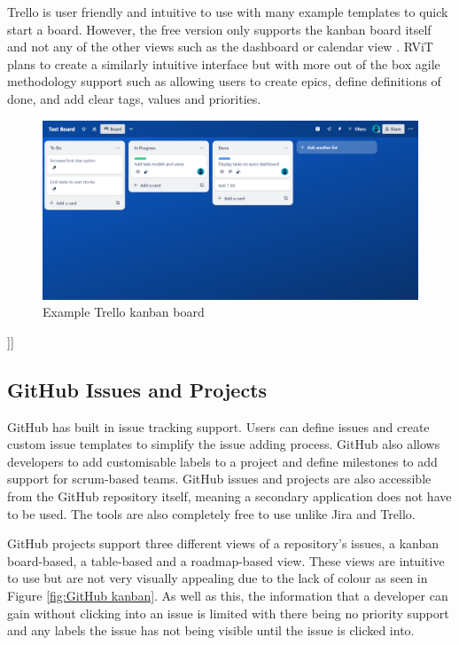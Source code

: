 \documentclass[l4proj.tex]{subfiles}
\begin{document}
Trello is user friendly and intuitive to use with many example templates to quick start a board. However, the free version only supports the kanban board itself and not any of the other views such as the dashboard or calendar view \cite{TrelloPricing}. RViT plans to create a similarly intuitive interface but with more out of the box agile methodology support such as allowing users to create epics, define definitions of done, and add clear tags, values and priorities.


\begin{figure}[h!]
\begin{center}
\includegraphics[scale=0.35]{dissertation/images/TrelloKanbanBoard.png}
\caption{Example Trello kanban board}
\label{fig:Trello kanban} 
\end{center}
\end{figure}
]]

\subsection{GitHub Issues and Projects}
GitHub has built in issue tracking support. Users can define issues and create custom issue templates to simplify the issue adding process. GitHub also allows developers to add customisable labels to a project and define milestones to add support for scrum-based teams. GitHub issues and projects are also accessible from the GitHub repository itself, meaning a secondary application does not have to be used. The tools are also completely free to use unlike Jira and Trello.

GitHub projects support three different views of a repository's issues, a kanban board-based, a table-based and a roadmap-based view. These views are intuitive to use but are not very visually appealing due to the lack of colour as seen in Figure \ref{fig:GitHub kanban}. As well as this, the information that a developer can gain without clicking into an issue is limited with there being no priority support and any labels the issue has not being visible until the issue is clicked into.
\end{document}
